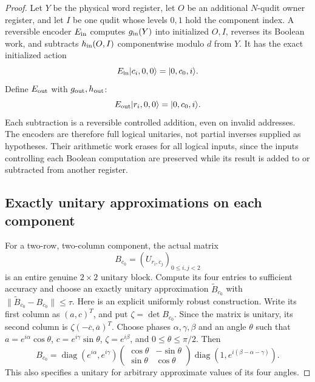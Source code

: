 \documentclass[11pt]{article}
\begin{document}
\begin{proof}
Let $Y$ be the physical word register, let $O$ be an
additional $N$-qudit owner register, and let $I$ be one
qudit whose levels $0,1$ hold the component index.
A reversible encoder $E_{\rm in}$ computes
$g_{\rm in}(Y)$ into initialized $O,I$, reverses its
Boolean work, and subtracts $h_{\rm in}(O,I)$
componentwise modulo $d$ from $Y$.
It has the exact initialized action
\[
 E_{\rm in}|c_i,0,0\rangle=|0,c_0,i\rangle.
\]
Define $E_{\rm out}$ with $g_{\rm out},h_{\rm out}$:
\[
 E_{\rm out}|r_i,0,0\rangle=|0,c_0,i\rangle.
\]
Each subtraction is a reversible controlled addition,
even on invalid addresses. The encoders are therefore
full logical unitaries, not partial inverses supplied
as hypotheses. Their arithmetic work erases for all
logical inputs, since the inputs controlling each
Boolean computation are preserved while its result
is added to or subtracted from another register.

\subsection*{Exactly unitary approximations on each component}

For a two-row, two-column component, the actual matrix
\[
 B_{c_0}=(U_{r_i,c_j})_{0\le i,j<2}
\]
is an entire genuine $2\times2$ unitary block.
Compute its four entries to sufficient accuracy and
choose an exactly unitary approximation
$\widetilde B_{c_0}$ with
$\|\widetilde B_{c_0}-B_{c_0}\|\le\tau$.
Here is an explicit uniformly robust construction.
Write its first column as $(a,c)^T$, and put
$\zeta=\det B_{c_0}$. Since the matrix is unitary,
its second column is $\zeta(-\overline c,\overline a)^T$.
Choose phases $\alpha,\gamma,\beta$ and an angle $\theta$
such that
$a=e^{i\alpha}\cos\theta$,
$c=e^{i\gamma}\sin\theta$,
$\zeta=e^{i\beta}$, and $0\le\theta\le\pi/2$.
Then
\[
 B_{c_0}=
 \operatorname{diag}(e^{i\alpha},e^{i\gamma})
 \begin{pmatrix}\cos\theta&-\sin\theta\\
                 \sin\theta& \cos\theta\end{pmatrix}
 \operatorname{diag}(1,e^{i(\beta-\alpha-\gamma)}).
\]
This also specifies a unitary for arbitrary approximate
values of its four angles.


\end{proof}
\end{document}
